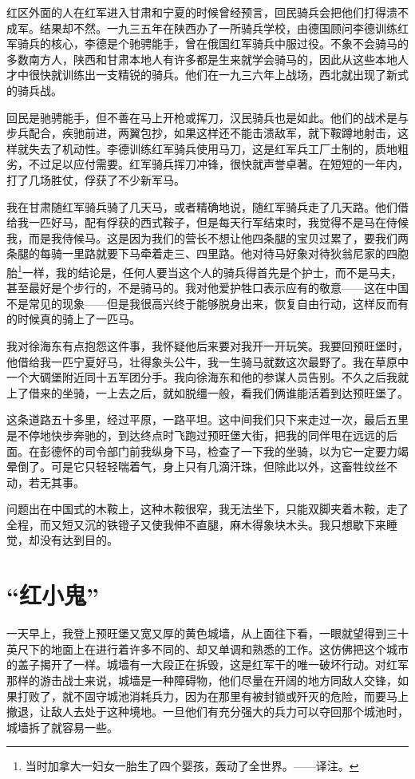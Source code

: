 \documentclass[10pt]{book}
\begin{document}
红区外面的人在红军进入甘肃和宁夏的时候曾经预言，回民骑兵会把他们打得溃不成军。结果却不然。一九三五年在陕西办了一所骑兵学校，由德国顾问李德训练红军骑兵的核心，李德是个驰骋能手，曾在俄国红军骑兵中服过役。不象不会骑马的多数南方人，陕西和甘肃本地人有许多都是生来就学会骑马的，因此从这些本地人才中很快就训练出一支精锐的骑兵。他们在一九三六年上战场，西北就出现了新式的骑兵战。

回民是驰骋能手，但不善在马上开枪或挥刀，汉民骑兵也是如此。他们的战术是与步兵配合，疾驰前进，两翼包抄，如果这样还不能击溃敌军，就下鞍蹲地射击，这样就失去了机动性。李德训练红军骑兵使用马刀，这是红军兵工厂土制的，质地粗劣，不过足以应付需要。红军骑兵挥刀冲锋，很快就声誉卓著。在短短的一年内，打了几场胜仗，俘获了不少新军马。

我在甘肃随红军骑兵骑了几天马，或者精确地说，随红军骑兵走了几天路。他们借给我一匹好马，配有俘获的西式鞍子，但是每天行军结束时，我觉得不是马在侍候我，而是我侍候马。这是因为我们的营长不想让他四条腿的宝贝过累了，要我们两条腿的每骑一里路就要下马牵着走三、四里路。他对待马好象对待狄翁尼家的四胞胎\footnote{当时加拿大一妇女一胎生了四个婴孩，轰动了全世界。——译注。}一样，我的结论是，任何人要当这个人的骑兵得首先是个护士，而不是马夫，甚至最好是个步行的，不是骑马的。我对他爱护牲口表示应有的敬意——这在中国不是常见的现象——但是我很高兴终于能够脱身出来，恢复自由行动，这样反而有的时候真的骑上了一匹马。

我对徐海东有点抱怨这件事，我怀疑他后来要对我开一开玩笑。我要回预旺堡时，他借给我一匹宁夏好马，壮得象头公牛，我一生骑马就数这次最野了。我在草原中一个大碉堡附近同十五军团分手。我向徐海东和他的参谋人员告别。不久之后我就上了借来的坐骑，一上去之后，就如脱缰一般，看我们俩谁能活着到达预旺堡了。

这条道路五十多里，经过平原，一路平坦。这中间我们只下来走过一次，最后五里是不停地快步奔驰的，到达终点时飞跑过预旺堡大街，把我的同伴甩在远远的后面。在彭德怀的司令部门前我纵身下马，检查了一下我的坐骑，以为它一定要力竭晕倒了。可是它只轻轻喘着气，身上只有几滴汗珠，但除此以外，这畜牲纹丝不动，若无其事。

问题出在中国式的木鞍上，这种木鞍很窄，我无法坐下，只能双脚夹着木鞍，走了全程，而又短又沉的铁镫子又使我伸不直腿，麻木得象块木头。我只想歇下来睡觉，却没有达到目的。



\section{“红小鬼”}

一天早上，我登上预旺堡又宽又厚的黄色城墙，从上面往下看，一眼就望得到三十英尺下的地面上在进行着许多不同的、却又单调和熟悉的工作。这仿佛把这个城市的盖子揭开了一样。城墙有一大段正在拆毁，这是红军干的唯一破坏行动。对红军那样的游击战士来说，城墙是一种障碍物，他们尽量在开阔的地方同敌人交锋，如果打败了，就不固守城池消耗兵力，因为在那里有被封锁或歼灭的危险，而要马上撤退，让敌人去处于这种境地。一旦他们有充分强大的兵力可以夺回那个城池时，城墙拆了就容易一些。
\end{document}
